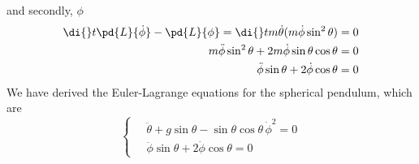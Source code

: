 and secondly, $\phi$
\begin{align*}
  \di {} t \pd{L}{\dot\phi} - \pd{L}{\phi} = \di {} t {m \dot \theta} (m \dot \phi \sin^2 \theta) &= 0\\
  m\ddot\phi\sin^2 \theta + 2m\dot \phi \sin \theta\cos \theta &= 0\\
  \ddot\phi\sin \theta + 2\dot \phi\cos \theta &= 0\\
\end{align*}
We have derived the Euler-Lagrange equations for the spherical pendulum, which are
$$ \begin{cases}
  \quad\ddot{\theta} + g\sin \theta - \sin \theta \cos \theta\,\dot \phi^2  = 0\\
  \quad\ddot\phi\sin \theta + 2\dot \phi\cos \theta = 0
\end{cases} $$
